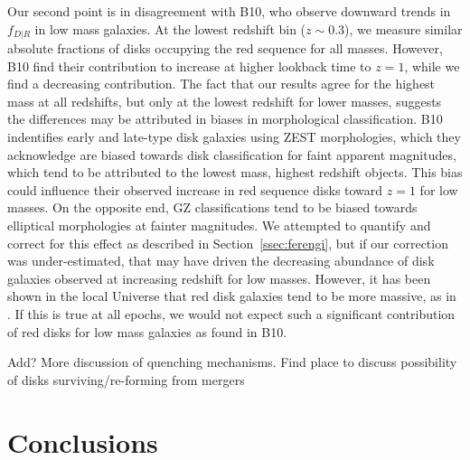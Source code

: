 \documentclass[useAMS,usenatbib]{mn2e}
\begin{document}
Our second point is in disagreement with B10, who observe downward trends in $f_{D|R}$ in low mass galaxies. At the lowest redshift bin ($z\sim0.3$), we measure similar absolute fractions of disks occupying the red sequence for all masses. However, B10 find their contribution to increase at higher lookback time to $z=1$, while we find a decreasing contribution. The fact that our results agree for the highest mass at all redshifts, but only at the lowest redshift for lower masses, suggests the differences may be attributed in biases in morphological classification. B10 indentifies early and late-type disk galaxies using ZEST \citep{Scarlata2007} morphologies, which they acknowledge are biased towards disk classification for faint apparent magnitudes, which tend to be attributed to the lowest mass, highest redshift objects. This bias could influence their observed increase in red sequence disks toward $z=1$ for low masses. On the opposite end, GZ classifications tend to be biased towards elliptical morphologies at fainter magnitudes. We attempted to quantify and correct for this effect as described in Section~\ref{ssec:ferengi}, but if our correction was under-estimated, that may have driven the decreasing abundance of disk galaxies observed at increasing redshift for low masses. However, it has been shown in the local Universe that red disk galaxies tend to be more massive, as in \citet{Masters2011}. If this is true at all epochs, we would not expect such a significant contribution of red disks for low mass galaxies as found in B10. 

Add? More discussion of quenching mechanisms. Find place to discuss possibility of disks surviving/re-forming from mergers \citep{Sparre2016,Springel2005a,Robertson2006,Governato2009}

%
%
\section{Conclusions}
\label{sec:conclusions}
\end{document}
